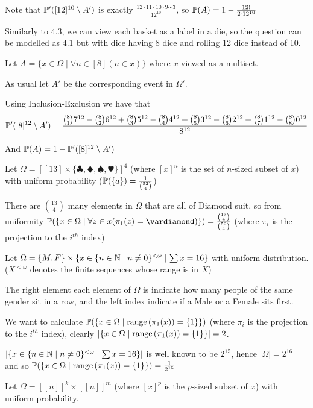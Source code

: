 \begin{cExercise}
\begin{cPart}
		Note that $\P'([12]^{10}\setminus A')$ is exactly $\frac{12\cdot 11\cdot 10\cdot 9\cdots 3}{12^{10}}$, so $\P(A)=1-\frac{12!}{2\cdot12^{10}}$
	\end{cPart}
	\begin{cPart}
		Similarly to 4.3, we can view each basket as a label in a die, so the question can be modelled as 4.1 but with dice having 8 dice and rolling 12 dice instead of 10.
		
		Let $A=\{x\in \Omega\mid \forall n\in[8](n\in x)\}$ where $x$ viewed as a multiset.
		
		As usual let $A'$ be the corresponding event in $\Omega'$.
		
		Using Inclusion-Exclusion we have that $$\P'([8]^{12}\setminus A')=\frac{{8\choose 1}7^{12}-{8\choose 2}6^{12}+{8\choose 3}5^{12}-{8\choose 4}4^{12}+{8\choose 5}3^{12}-{8\choose 6}2^{12}+{8\choose 7}1^{12}-{8\choose 8}0^{12}}{8^{12}}$$
		
		And $\P(A)=1-\P'([8]^{12}\setminus A')$
	\end{cPart}
	\begin{cPart}
		Let $\Omega=[[13]\times\{\clubsuit,\vardiamond,\spadesuit,\varheart\}]^4$ (where $[x]^n$ is the set of $n$-sized subset of $x$) with uniform probability ($\P(\{a\})=\frac1{{52\choose 4}}$)
		
		There are ${13\choose 4}$ many elements in $\Omega$ that are all of Diamond suit, so from uniformity $\P(\{x\in\Omega\mid \forall z\in x(\pi_1(z)=\vardiamond)\})=\frac{{13\choose 4}}{{52\choose 4}}$ (where $\pi_i$ is the projection to the $i^{th}$ index)
	\end{cPart}
	\begin{cPart}
		Let $\Omega=\{M,F\}\times\{x\in\{n\in \N\mid n\ne 0\}^{<\omega}\mid \sum x=16\}$ with uniform distribution. ($X^{<\omega}$ denotes the finite sequences whose range is in $X$)
		
		The right element each element of $\Omega$ is indicate how many people of the same gender sit in a row, and the left index indicate if a Male or a Female sits first.
		
		We want to calculate $\P(\{x\in\Omega\mid \range{\pi_1(x)}=\{1\}\})$ (where $\pi_i$ is the projection to the $i^{th}$ index), clearly $|\{x\in\Omega\mid \range{\pi_1(x)}=\{1\}\}|=2$.
		
		$|\{x\in\{n\in \N\mid n\ne 0\}^{<\omega}\mid \sum x=16\}|$ is well known to be $2^{15}$, hence $|\Omega|=2^{16}$ and so $\P(\{x\in\Omega\mid \range{\pi_1(x)}=\{1\}\})=\frac1{2^{15}}$
	\end{cPart}
	\begin{cPart}
		Let $\Omega=[[n]]^k\times[[n]]^m$ (where $[x]^p$ is the $p$-sized subset of $x$) with uniform probability.
		

\end{cPart}
\end{cExercise}
